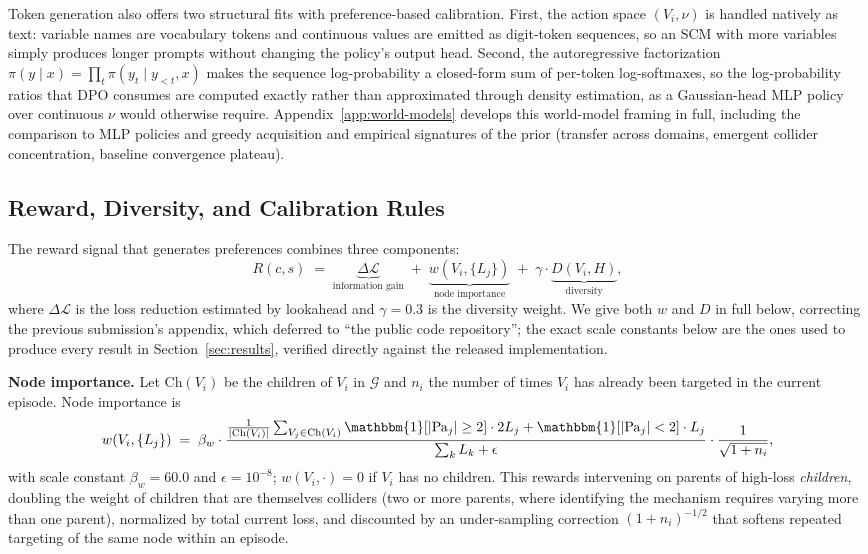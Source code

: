 \documentclass{article}
\theoremstyle{plain}
\theoremstyle{definition}
\theoremstyle{remark}
\begin{document}
Token generation also offers two structural fits with preference-based calibration. First, the action space $(V_i, \nu)$ is handled natively as text: variable names are vocabulary tokens and continuous values are emitted as digit-token sequences, so an SCM with more variables simply produces longer prompts without changing the policy's output head. Second, the autoregressive factorization $\pi(y \mid x) = \prod_t \pi(y_t \mid y_{<t}, x)$ makes the sequence log-probability a closed-form sum of per-token log-softmaxes, so the log-probability ratios that DPO consumes are computed exactly rather than approximated through density estimation, as a Gaussian-head MLP policy over continuous $\nu$ would otherwise require. Appendix~\ref{app:world-models} develops this world-model framing in full, including the comparison to MLP policies and greedy acquisition and empirical signatures of the prior (transfer across domains, emergent collider concentration, baseline convergence plateau).

\subsection{Reward, Diversity, and Calibration Rules}
\label{sec:dpo}

The reward signal that generates preferences combines three components:
\begin{equation}
\label{eq:reward}
R(c, s) \;=\; \underbrace{\Delta\mathcal{L}}_{\text{information gain}} \;+\; \underbrace{w(V_i, \{L_j\})}_{\text{node importance}} \;+\; \gamma \cdot \underbrace{D(V_i, H)}_{\text{diversity}},
\end{equation}
where $\Delta\mathcal{L}$ is the loss reduction estimated by lookahead and $\gamma = 0.3$ is the diversity weight. We give both $w$ and $D$ in full below, correcting the previous submission's appendix, which deferred to ``the public code repository''; the exact scale constants below are the ones used to produce every result in Section~\ref{sec:results}, verified directly against the released implementation.

\textbf{Node importance.} Let $\text{Ch}(V_i)$ be the children of $V_i$ in $\mathcal{G}$ and $n_i$ the number of times $V_i$ has already been targeted in the current episode. Node importance is
\begin{equation}
\label{eq:node-importance}
w(V_i, \{L_j\}) \;=\; \beta_w \cdot \frac{\frac{1}{|\text{Ch}(V_i)|}\sum_{V_j \in \text{Ch}(V_i)} \mathbbm{1}[|\text{Pa}_j| \ge 2] \cdot 2 L_j + \mathbbm{1}[|\text{Pa}_j| < 2] \cdot L_j}{\sum_k L_k + \epsilon} \cdot \frac{1}{\sqrt{1 + n_i}},
\end{equation}
with scale constant $\beta_w = 60.0$ and $\epsilon = 10^{-8}$; $w(V_i,\cdot)=0$ if $V_i$ has no children. This rewards intervening on parents of high-loss \emph{children}, doubling the weight of children that are themselves colliders (two or more parents, where identifying the mechanism requires varying more than one parent), normalized by total current loss, and discounted by an under-sampling correction $(1+n_i)^{-1/2}$ that softens repeated targeting of the same node within an episode.
\end{document}
